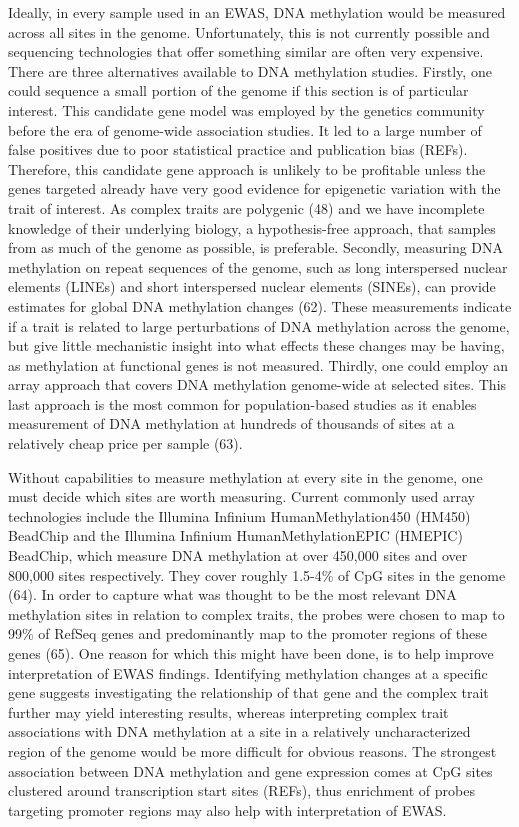 \documentclass[11pt,oneside]{bristolthesis}
\begin{document}
Ideally, in every sample used in an EWAS, DNA methylation would be measured across all sites in the genome. Unfortunately, this is not currently possible and sequencing technologies that offer something similar are often very expensive. There are three alternatives available to DNA methylation studies. Firstly, one could sequence a small portion of the genome if this section is of particular interest. This candidate gene model was employed by the genetics community before the era of genome-wide association studies. It led to a large number of false positives due to poor statistical practice and publication bias (REFs). Therefore, this candidate gene approach is unlikely to be profitable unless the genes targeted already have very good evidence for epigenetic variation with the trait of interest. As complex traits are polygenic (48) and we have incomplete knowledge of their underlying biology, a hypothesis-free approach, that samples from as much of the genome as possible, is preferable. Secondly, measuring DNA methylation on repeat sequences of the genome, such as long interspersed nuclear elements (LINEs) and short interspersed nuclear elements (SINEs), can provide estimates for global DNA methylation changes (62). These measurements indicate if a trait is related to large perturbations of DNA methylation across the genome, but give little mechanistic insight into what effects these changes may be having, as methylation at functional genes is not measured. Thirdly, one could employ an array approach that covers DNA methylation genome-wide at selected sites. This last approach is the most common for population-based studies as it enables measurement of DNA methylation at hundreds of thousands of sites at a relatively cheap price per sample (63).

Without capabilities to measure methylation at every site in the genome, one must decide which sites are worth measuring. Current commonly used array technologies include the Illumina Infinium HumanMethylation450 (HM450) BeadChip and the Illumina Infinium HumanMethylationEPIC (HMEPIC) BeadChip, which measure DNA methylation at over 450,000 sites and over 800,000 sites respectively. They cover roughly 1.5-4\% of CpG sites in the genome (64). In order to capture what was thought to be the most relevant DNA methylation sites in relation to complex traits, the probes were chosen to map to 99\% of RefSeq genes and predominantly map to the promoter regions of these genes (65). One reason for which this might have been done, is to help improve interpretation of EWAS findings. Identifying methylation changes at a specific gene suggests investigating the relationship of that gene and the complex trait further may yield interesting results, whereas interpreting complex trait associations with DNA methylation at a site in a relatively uncharacterized region of the genome would be more difficult for obvious reasons. The strongest association between DNA methylation and gene expression comes at CpG sites clustered around transcription start sites (REFs), thus enrichment of probes targeting promoter regions may also help with interpretation of EWAS.
\end{document}
